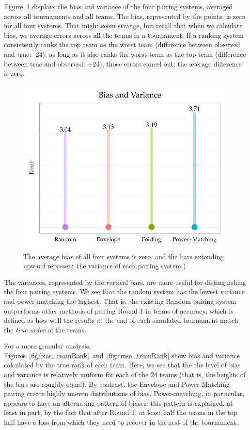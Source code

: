 \documentclass{tufte-handout}
\begin{document}
Figure~\ref{fig:bias_var} displays the bias and variance of the four pairing systems, averaged across all tournaments and all teams. The bias, represented by the points, is zero for all four systems. That might seem strange, but recall that when we calculate bias, we average errors across all the teams in a tournament. If a ranking system consistently ranks the top team as the worst team (difference between observed and true: -24), as long as it also ranks the worst team as the top team (difference between true and observed: +24), those errors cancel out: the average difference is zero.  
\begin{figure}
  \includegraphics[width=0.7\linewidth]{error_bar.pdf}
  \caption{The average bias of all four systems is zero, and the bars extending upward represent the variance of each pairing system.)}
  \label{fig:bias_var}
\end{figure}

The variances, represented by the vertical bars, are more useful for distinguishing the four pairing systems. We see that the random system has the lowest variance and power-matching the highest. That is, the existing Random pairing system outperforms other methods of pairing Round 1 in terms of accuracy, which is defined as how well the results at the end of each simulated tournament match the \emph{true order} of the teams.

For a more granular analysis, Figures~\ref{fig:bias_teamRank}~and~\ref{fig:rmse_teamRank} show bias and variance calculated by the true rank of each team. Here, we see that the the level of bias and variance is relatively uniform for each of the 24 teams (that is, the heights of the bars are roughly equal). By contrast, the Envelope and Power-Matching pairing create highly uneven distributions of bias. Power-matching, in particular, appears to have an alternating pattern of biases: this pattern is explained, at least in part, by the fact that after Round 1, at least half the teams in the top half have a loss from which they need to recover in the rest of the tournament. 
\end{document}
